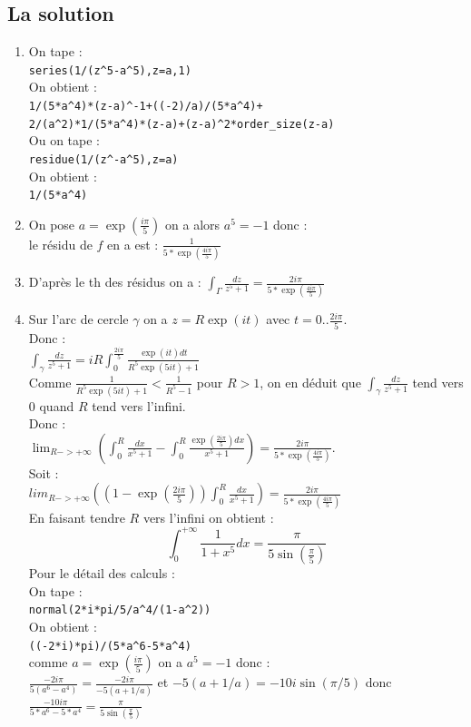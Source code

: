 \documentclass[a4paper,11pt]{book}
\begin{document}
\subsection{La solution}
\begin{enumerate}
\item On tape :\\
{\tt series(1/(z\verb|^|5-a\verb|^|5),z=a,1)}\\
On obtient :\\
{\tt 1/(5*a\verb|^|4)*(z-a)\verb|^|-1+((-2)/a)/(5*a\verb|^|4)+ \\
2/(a\verb|^|2)*1/(5*a\verb|^|4)*(z-a)+(z-a)\verb|^|2*order\_size(z-a)}\\
Ou on tape :\\
{\tt residue(1/(z\verb|^|-a\verb|^|5),z=a)}\\
On obtient :\\
{\tt 1/(5*a\verb|^|4)}
\item On pose $\displaystyle a=\exp(\frac{i\pi}{5})$ on a alors $a^5=-1$ donc :\\
le r\'esidu de $f$ en a est : $\displaystyle\frac{1}{5*\exp(\frac{4i\pi}{5})}$
\item D'apr\`es le th des r\'esidus on a :
$\displaystyle \int_\Gamma\frac{dz}{z^5+1}=\frac{2i\pi}{5*\exp(\frac{4i\pi}{5})}$
\item 
Sur l'arc de cercle $\gamma$ on a $z=R\exp(it)$ avec $t=0..\frac{2i\pi}{5}$.\\
Donc :\\
$\displaystyle \int_\gamma\frac{dz}{z^5+1}=iR \int_0^{\frac{2i\pi}{5}}\frac{\exp(it)dt}{R^5\exp(5it)+1}$\\
Comme $\displaystyle \frac{1}{R^5\exp(5it)+1}<\frac{1}{R^5-1}$ pour $R>1$, on 
en d\'eduit que 
$\displaystyle \int_\gamma\frac{dz}{z^5+1}$ tend vers 0 quand $R$ tend vers 
l'infini.\\
Donc :\\
$\displaystyle \lim_{R->+\infty}(\int_0^R\frac{dx}{x^5+1}-\int_0^R\frac{\exp(\frac{2i\pi}{5})dx}{x^5+1})=\frac{2i\pi}{5*\exp(\frac{4i\pi}{5})}$.\\
Soit :\\
$lim_{R->+\infty}((1-\exp(\frac{2i\pi}{5}))\int_0^R\frac{dx}{x^5+1})=\frac{2i\pi}{5*\exp(\frac{4i\pi}{5})}$\\
En faisant tendre $R$ vers l'infini on obtient :
 $$\int_0^{+\infty}\frac{1}{1+x^5}dx=\frac{\pi}{5\sin(\frac{\pi}{5})}$$
Pour le d\'etail des calculs :\\
On tape :\\
{\tt normal(2*i*pi/5/a\verb|^|4/(1-a\verb|^|2))}\\
On obtient :\\
{\tt ((-2*i)*pi)/(5*a\verb|^|6-5*a\verb|^|4)}\\
comme $\displaystyle a=\exp(\frac{i\pi}{5})$ on a $a^5=-1$ donc :\\
$\displaystyle \frac{-2i\pi}{5(a^6-a^4)}=\frac{-2i\pi}{-5(a+1/a)}$ et 
$\displaystyle -5(a+1/a)=-10i\sin(\pi/5)$ donc \\
$\displaystyle \frac{-10i\pi}{5*a^6-5*a^4}=\frac{\pi}{5\sin(\frac{\pi}{5})}$
\end{enumerate}
\end{document}
